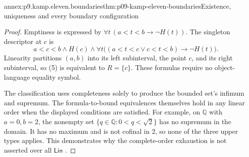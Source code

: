 \begin{annexitem}{annex:p9.kamp.eleven.boundaries}{thm:p09-kamp-eleven-boundaries}{Existence, uniqueness and every boundary configuration}
\begin{proof}
Emptiness is expressed by
\(\forall t\,(a<t<b\to\neg H(t))\).
The singleton descriptor at \(c\) is
\[
 a<c<b\land H(c)\land
 \forall t\bigl((a<t<c\lor c<t<b)\to\neg H(t)\bigr).
 \tag{5}
\]
Linearity partitions \((a,b)\) into its left subinterval,
the point \(c\), and its right subinterval, so (5) is
equivalent to \(R=\{c\}\). These formulas require no
object-language equality symbol.

The classification uses completeness solely to produce the bounded
set's infimum and supremum. The formula-to-bound equivalences themselves
hold in any linear order when the displayed conditions are satisfied.
For example, on \(\mathbb Q\) with \(a=0,b=2\), the
nonempty set \(\{q\in\mathbb Q:0<q<\sqrt2\}\) has no
supremum in the domain. It has no maximum and is not cofinal in
2, so none of the three upper types applies. This demonstrates
why the complete-order exhaustion is not asserted over all
\(\mathsf{Lin}\) \cite[ch.~III, p.~85]{Kamp1968}.
\end{proof}
\end{annexitem}

